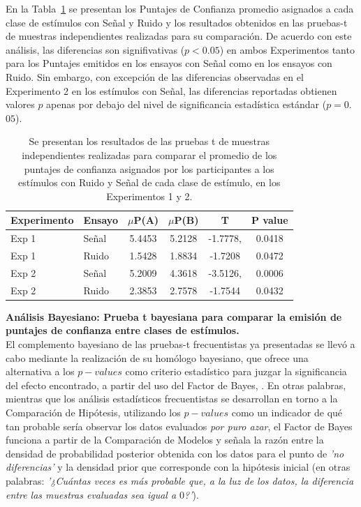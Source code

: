 En la Tabla~\ref{Tabla_t-Confidence} se presentan los Puntajes de Confianza promedio asignados a cada clase de estímulos con Señal y Ruido y los resultados obtenidos en las pruebas-t de muestras independientes realizadas para su comparación. De acuerdo con este análisis, las diferencias son signifivativas ($p<0.05$) en ambos Experimentos tanto para los Puntajes emitidos  en los ensayos con Señal como en los ensayos con Ruido. Sin embargo, con excepción de las diferencias observadas en el Experimento 2 en los estímulos con Señal, las diferencias reportadas obtienen valores $p$ apenas por debajo del nivel de significancia estadística estándar ($p=0$.$05$).\\

\begin{table}
\caption[Prueba T para evaluar diferencias en las medias de los puntajes de confianza asigandos entre condiciones]{Se presentan los resultados de las pruebas t de muestras independientes realizadas para comparar el promedio de los puntajes de confianza asignados por los participantes a los estímulos con Ruido y Señal de cada clase de estímulo, en los Experimentos 1 y 2.}
\label{Tabla_t-Confidence}
\centering
\begin{tabular}{l l |  c c c c}
\toprule
\textbf{Experimento} & \textbf{Ensayo} & \textbf{$\mu$P(A)} & \textbf{$\mu$P(B)} & \textbf{T} & \textbf{P value}\\
\midrule
Exp 1 & Señal & 5.4453 & 5.2128 & -1.7778, & 0.0418 \\
Exp 1 & Ruido & 1.5428 & 1.8834 & -1.7208 & 0.0472 \\
Exp 2 & Señal & 5.2009 & 4.3618  & -3.5126, & 0.0006 \\
Exp 2 & Ruido & 2.3853 & 2.7578 & -1.7544 & 0.0432 \\
\bottomrule
\end{tabular}
\end{table}

\textbf{Análisis Bayesiano: Prueba t bayesiana para comparar la emisión de puntajes de confianza entre clases de estímulos.}\\

El complemento bayesiano de las pruebas-t frecuentistas ya presentadas se llevó a cabo mediante la realización de su homólogo bayesiano, que ofrece una alternativa a los $p-values$ como criterio estadístico para juzgar la significancia del efecto encontrado, a partir del uso del Factor de Bayes, \parencite{Lee2016}. En otras palabras, mientras que los análisis estadísticos frecuentistas se desarrollan en torno a la Comparación de Hipótesis, utilizando los $p-values$ como un indicador de qué tan probable sería observar los datos evaluados \textit{por puro azar}, el Factor de Bayes funciona a partir de la Comparación de Modelos y señala la razón entre la densidad de probabilidad posterior obtenida con los datos para el punto de \textit{'no diferencias'} y la densidad prior que corresponde con la hipótesis inicial (en otras palabras: \textit{'¿Cuántas veces es más probable que, a la luz de los datos, la diferencia entre las muestras evaluadas sea igual a $0$?'}).\\

